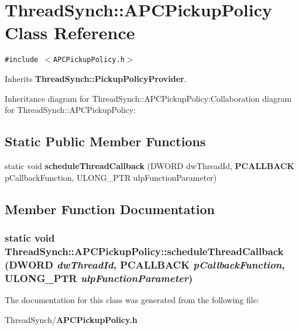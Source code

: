 \section{Thread\-Synch::APCPickup\-Policy Class Reference}
\label{class_thread_synch_1_1_a_p_c_pickup_policy}
{\tt \#include $<$APCPickup\-Policy.h$>$}

Inherits {\bf Thread\-Synch::Pickup\-Policy\-Provider}.

Inheritance diagram for Thread\-Synch::APCPickup\-Policy:Collaboration diagram for Thread\-Synch::APCPickup\-Policy:\subsection*{Static Public Member Functions}
\begin{CompactItemize}
\item 
static void {\bf schedule\-Thread\-Callback} (DWORD dw\-Thread\-Id, {\bf PCALLBACK} p\-Callback\-Function, ULONG\_\-PTR ulp\-Function\-Parameter)
\end{CompactItemize}


\subsection{Member Function Documentation}
\subsubsection{\setlength{\rightskip}{0pt plus 5cm}static void Thread\-Synch::APCPickup\-Policy::schedule\-Thread\-Callback (DWORD {\em dw\-Thread\-Id}, {\bf PCALLBACK} {\em p\-Callback\-Function}, ULONG\_\-PTR {\em ulp\-Function\-Parameter})\hspace{0.3cm}{\tt  [inline, static]}}\label{class_thread_synch_1_1_a_p_c_pickup_policy_a5b6c8d230a7ef7ea69c7b6a51ae3289}




The documentation for this class was generated from the following file:\begin{CompactItemize}
\item 
Thread\-Synch/{\bf APCPickup\-Policy.h}\end{CompactItemize}

